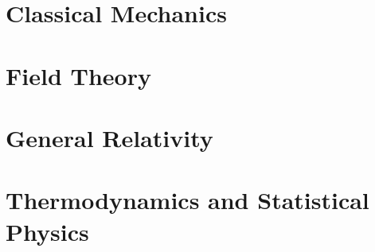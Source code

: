 \documentclass{article}
\begin{document}
\tableofcontents

\newpage
\section{Classical Mechanics}


\newpage
\section{Field Theory}


\newpage
\section{General Relativity}


\newpage
\section{Thermodynamics and Statistical Physics}

\end{document}
